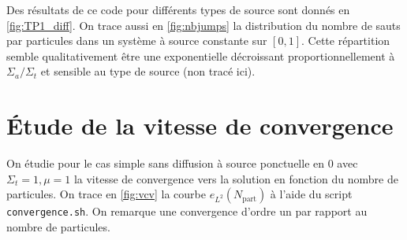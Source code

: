 \documentclass[11pt,a4paper]{article}
\begin{document}
Des résultats de ce code pour différents types de source sont donnés en \autoref{fig:TP1_diff}. On trace aussi en \autoref{fig:nbjumps} la distribution du nombre de sauts par particules dans un système à source constante sur $[0,1]$. Cette répartition semble qualitativement être une exponentielle décroissant proportionnellement à $\Sigma_a/\Sigma_t$ et sensible au type de source (non tracé ici).


\section{Étude de la vitesse de convergence}

On étudie pour le cas simple sans diffusion à source ponctuelle en $0$ avec $\Sigma_t=1, \mu=1$ la vitesse de convergence vers la solution en fonction du nombre de particules. On trace en \autoref{fig:vcv} la courbe $e_{L^2}(N_{\text{part}})$ à l'aide du script \texttt{convergence.sh}. On remarque une convergence d'ordre un par rapport au nombre de particules.   
\end{document}
